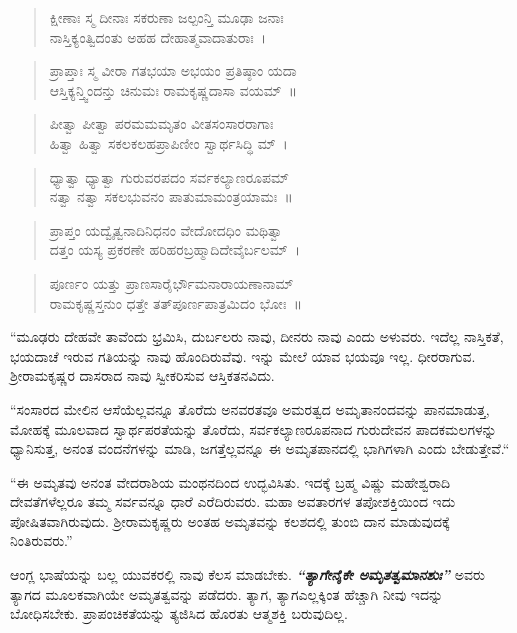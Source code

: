 \newpage

\begin{verse}
 ಕ್ಷೀಣಾಃ ಸ್ಮ ದೀನಾಃ ಸಕರುಣಾ ಜಲ್ಪಂನ್ತಿ ಮೂಢಾ ಜನಾಃ\\
 ನಾಸ್ತಿಕ್ಯಂತ್ವಿದಂತು ಅಹಹ ದೇಹಾತ್ಮವಾದಾತುರಾಃ~। 
\end{verse}

\begin{verse}
 ಪ್ರಾಪ್ತಾಃ ಸ್ಮ ವೀರಾ ಗತಭಯಾ ಅಭಯಂ ಪ್ರತಿಷ್ಠಾಂ ಯದಾ\\
 ಆಸ್ತಿಕ್ಯನ್ತ್ವಿಂದನ್ತು ಚಿನುಮಃ ರಾಮಕೃಷ್ಣದಾಸಾ ವಯಮ್~॥ 
\end{verse}

\begin{verse}
 ಪೀತ್ವಾ ಪೀತ್ವಾ ಪರಮಮಮೃತಂ ವೀತಸಂಸಾರರಾಗಾಃ\\
 ಹಿತ್ವಾ ಹಿತ್ವಾ ಸಕಲಕಲಹಪ್ರಾಪಿಣೀಂ ಸ್ವಾರ್ಥಸಿದ್ಧಿ ಮ್~। 
\end{verse}

\begin{verse}
 ಧ್ಯಾತ್ವಾ ಧ್ಯಾತ್ವಾ ಗುರುವರಪದಂ ಸರ್ವಕಲ್ಯಾಣರೂಪಮ್\\
 ನತ್ವಾ ನತ್ವಾ ಸಕಲಭುವನಂ ಪಾತುಮಾಮಂತ್ರಯಾಮಃ~॥ 
\end{verse}

\begin{verse}
 ಪ್ರಾಪ್ತಂ ಯದ್ವೈತ್ವನಾದಿನಿಧನಂ ವೇದೋದಧಿಂ ಮಥಿತ್ವಾ\\
 ದತ್ತಂ ಯಸ್ಯ ಪ್ರಕರಣೇ ಹರಿಹರಬ್ರಹ್ಮಾದಿದೇವೈರ್ಬಲಮ್~। 
\end{verse}

\begin{verse}
 ಪೂರ್ಣಂ ಯತ್ತು ಪ್ರಾಣಸಾರೈರ್ಭೌಮನಾರಾಯಣಾನಾಮ್\\
 ರಾಮಕೃಷ್ಣಸ್ತನುಂ ಧತ್ತೇ ತತ್‌ಪೂರ್ಣಪಾತ್ರಮಿದಂ ಭೋಃ~॥ 
\end{verse}

“ಮೂಢರು ದೇಹವೇ ತಾವೆಂದು ಭ್ರಮಿಸಿ, ದುರ್ಬಲರು ನಾವು, ದೀನರು ನಾವು ಎಂದು ಅಳುವರು. ಇದೆಲ್ಲ ನಾಸ್ತಿಕತೆ, ಭಯದಾಚೆ ಇರುವ ಗತಿಯನ್ನು ನಾವು ಹೊಂದಿರುವೆವು. ಇನ್ನು ಮೇಲೆ ಯಾವ ಭಯವೂ ಇಲ್ಲ. ಧೀರರಾಗುವ. ಶ‍್ರೀರಾಮಕೃಷ್ಣರ ದಾಸರಾದ ನಾವು ಸ್ವೀಕರಿಸುವ ಆಸ್ತಿಕತನವಿದು.

“ಸಂಸಾರದ ಮೇಲಿನ ಆಸೆಯೆಲ್ಲವನ್ನೂ ತೊರೆದು ಅನವರತವೂ ಅಮರತ್ವದ ಅಮೃತಾನಂದವನ್ನು ಪಾನಮಾಡುತ್ತ, ಮೋಹಕ್ಕೆ ಮೂಲವಾದ ಸ್ವಾರ್ಥಪರತೆಯನ್ನು ತೊರೆದು, ಸರ್ವಕಲ್ಯಾಣರೂಪನಾದ ಗುರುದೇವನ ಪಾದಕಮಲಗಳನ್ನು ಧ್ಯಾನಿಸುತ್ತ, ಅನಂತ ವಂದನೆಗಳನ್ನು ಮಾಡಿ, ಜಗತ್ತೆಲ್ಲವನ್ನೂ ಈ ಅಮೃತಪಾನದಲ್ಲಿ ಭಾಗಿಗಳಾಗಿ ಎಂದು ಬೇಡುತ್ತೇವೆ.“

“ಈ ಅಮೃತವು ಅನಂತ ವೇದರಾಶಿಯ ಮಂಥನದಿಂದ ಉದ್ಭವಿಸಿತು. ಇದಕ್ಕೆ ಬ್ರಹ್ಮ ವಿಷ್ಣು ಮಹೇಶ್ವರಾದಿ ದೇವತೆಗಳೆಲ್ಲರೂ ತಮ್ಮ ಸರ್ವವನ್ನೂ ಧಾರೆ ಎರೆದಿರುವರು. ಮಹಾ ಅವತಾರಗಳ ತಪೋಶಕ್ತಿಯಿಂದ ಇದು ಪೋಷಿತವಾಗಿರುವುದು. ಶ‍್ರೀರಾಮಕೃಷ್ಣರು ಅಂತಹ ಅಮೃತವನ್ನು ಕಲಶದಲ್ಲಿ ತುಂಬಿ ದಾನ ಮಾಡುವುದಕ್ಕೆ ನಿಂತಿರುವರು.”

ಆಂಗ್ಲ ಭಾಷೆಯನ್ನು ಬಲ್ಲ ಯುವಕರಲ್ಲಿ ನಾವು ಕೆಲಸ ಮಾಡಬೇಕು. \textbf{\textit{ “ತ್ಯಾಗೇನೈಕೇ ಅಮೃತತ್ವಮಾನಶುಃ”}} ಅವರು ತ್ಯಾಗದ ಮೂಲಕವಾಗಿಯೇ ಅಮೃತತ್ವವನ್ನು ಪಡೆದರು. ತ್ಯಾಗ, ತ್ಯಾಗ\enginline{-}ಎಲ್ಲಕ್ಕಿಂತ ಹೆಚ್ಚಾಗಿ ನೀವು ಇದನ್ನು ಬೋಧಿಸಬೇಕು. ಪ್ರಾಪಂಚಿಕತೆಯನ್ನು ತ್ಯಜಿಸಿದ ಹೊರತು ಆತ್ಮಶಕ್ತಿ ಬರುವುದಿಲ್ಲ.

